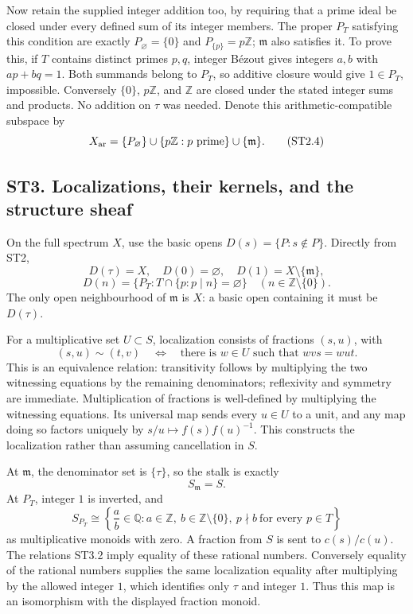 Now retain the supplied integer addition too, by requiring that a prime
ideal be closed under every defined sum of its integer members. The
proper \(P_T\) satisfying this condition are exactly
\(P_\varnothing=\{0\}\) and \(P_{\{p\}}=p\mathbb Z\); \(\mathfrak m\)
also satisfies it. To prove this, if \(T\) contains distinct primes
\(p,q\), integer Bézout gives integers \(a,b\) with \(ap+bq=1\). Both
summands belong to \(P_T\), so additive closure would give \(1\in P_T\),
impossible. Conversely \(\{0\}\), \(p\mathbb Z\), and \(\mathbb Z\) are
closed under the stated integer sums and products. No addition on
\(\tau\) was needed. Denote this arithmetic-compatible subspace by \[
 X_{\rm ar}=\{P_\varnothing\}\cup\{p\mathbb Z:p\text{ prime}\}
 \cup\{\mathfrak m\}.
\tag{ST2.4}
\]

\subsection{ST3. Localizations, their kernels, and the structure
sheaf}\label{st3.-localizations-their-kernels-and-the-structure-sheaf}

On the full spectrum \(X\), use the basic opens
\(D(s)=\{P:s\notin P\}\). Directly from ST2, \[
 D(\tau)=X,\quad D(0)=\varnothing,\quad
 D(1)=X\setminus\{\mathfrak m\},
\] \[
 D(n)=\{P_T:T\cap\{p:p\mid n\}=\varnothing\}
 \quad(n\in\mathbb Z\setminus\{0\}).
\tag{ST3.1}
\] The only open neighbourhood of \(\mathfrak m\) is \(X\): a basic open
containing it must be \(D(\tau)\).

For a multiplicative set \(U\subset S\), localization consists of
fractions \((s,u)\), with \[
 (s,u)\sim(t,v)
 \quad\Longleftrightarrow\quad
 \text{there is }w\in U\text{ such that }wvs=wut.
\tag{ST3.2}
\] This is an equivalence relation: transitivity follows by multiplying
the two witnessing equations by the remaining denominators; reflexivity
and symmetry are immediate. Multiplication of fractions is well-defined
by multiplying the witnessing equations. Its universal map sends every
\(u\in U\) to a unit, and any map doing so factors uniquely by
\(s/u\mapsto f(s)f(u)^{-1}\). This constructs the localization rather
than assuming cancellation in \(S\).

At \(\mathfrak m\), the denominator set is \(\{\tau\}\), so the stalk is
exactly \[
 S_{\mathfrak m}=S.
\tag{ST3.3}
\] At \(P_T\), integer \(1\) is inverted, and \[
 S_{P_T}\cong
 \left\{\frac ab\in\mathbb Q:
 a\in\mathbb Z,\ b\in\mathbb Z\setminus\{0\},
 \ p\nmid b\ \text{for every }p\in T\right\}
\tag{ST3.4}
\] as multiplicative monoids with zero. A fraction from \(S\) is sent to
\(c(s)/c(u)\). The relations ST3.2 imply equality of these rational
numbers. Conversely equality of the rational numbers supplies the same
localization equality after multiplying by the allowed integer \(1\),
which identifies only \(\tau\) and integer \(1\). Thus this map is an
isomorphism with the displayed fraction monoid.

